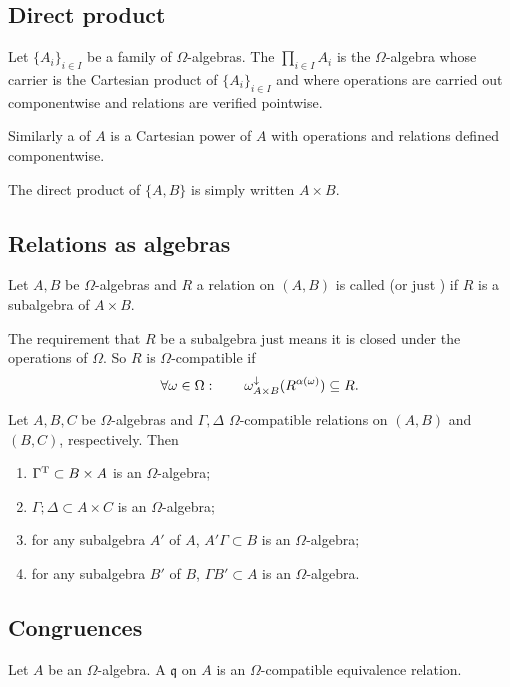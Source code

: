 \subsection{Direct product}
\begin{definition}
Let $\{A_i\}_{i\in I}$ be a family of $\Omega$-algebras. The  $\prod_{i\in I} A_i$ is the $\Omega$-algebra whose carrier is the Cartesian product of $\{A_i\}_{i\in I}$ and where operations are carried out componentwise and relations are verified pointwise.

Similarly a  of $A$ is a Cartesian power of $A$ with operations and relations defined componentwise.
\end{definition}

The direct product of $\{A,B\}$ is simply written $A\times B$.

\subsection{Relations as algebras}
\begin{definition}
Let $A,B$ be $\Omega$-algebras and $R$ a relation on $(A,B)$ is called  (or just ) if $R$ is a subalgebra of $A\times B$.
\end{definition}
The requirement that $R$ be a subalgebra just means it is closed under the operations of $\Omega$. So $R$ is $\Omega$-compatible if
\[ \forall \omega\in\Omega: \qquad \omega_{A\times B}^\downarrow(R^{\alpha(\omega)}) \subseteq R. \]

\begin{lemma}
Let $A,B,C$ be $\Omega$-algebras and $\Gamma, \Delta$ $\Omega$-compatible relations on $(A, B)$ and $(B, C)$, respectively. Then
\begin{enumerate}
\item $\Gamma^{\mathrm{T}} \subset B\times A$ is an $\Omega$-algebra;
\item $\Gamma;\Delta \subset A\times C$ is an $\Omega$-algebra;
\item for any subalgebra $A'$ of $A$, $A'\Gamma \subset B$ is an $\Omega$-algebra;
\item for any subalgebra $B'$ of $B$, $\Gamma B' \subset A$ is an $\Omega$-algebra.
\end{enumerate}
\end{lemma}

\subsection{Congruences}
\begin{definition}
Let $A$ be an $\Omega$-algebra. A  $\mathfrak{q}$ on $A$ is an $\Omega$-compatible equivalence relation.
\end{definition}

